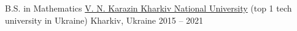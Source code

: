 


\begin{cventries}


\cventry
{B.S. in Mathematics} %
{\href{https://univer.kharkov.ua/en}{V. N. Karazin Kharkiv National University} (top 1 tech university in Ukraine)} %
{Kharkiv, Ukraine} %
{2015 -- 2021} %
{ %
}


\end{cventries}